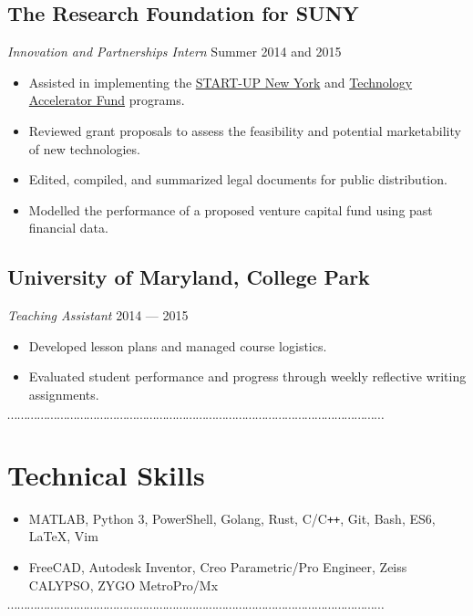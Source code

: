 \documentclass[10pt]{article}
\newcommand{\dotfringe}{
    \begin{center}
      $\cdots\cdots\cdots\cdots\cdots\cdots\cdots\cdots\cdots\cdots\cdots\cdots\cdots\cdots\cdots\cdots\cdots\cdots\cdots\cdots\cdots\cdots\cdots\cdots\cdots\cdots\cdots\cdots\cdots\cdots\cdots\cdots\cdots\cdots\cdots\cdots\cdots\cdots$
    \end{center}
}
\begin{document}
\subsection*{The Research Foundation for SUNY}
\textit{Innovation and Partnerships Intern} \hfill Summer 2014 and 2015
\begin{itemize}
  \item Assisted in implementing the \href{https://esd.ny.gov/startup-ny-program}{START-UP New York} and \href{https://www.rfsuny.org/Our-Work/Innovation-and-Partnerships/Programs/Technology-Accelerator-Fund/}{Technology Accelerator Fund} programs.
  \item Reviewed grant proposals to assess the feasibility and potential marketability of new technologies.
  \item Edited, compiled, and summarized legal documents for public distribution.
  \item Modelled the performance of a proposed venture capital fund using past financial data.
\end{itemize}
\subsection*{University of Maryland, College Park}
\textit{Teaching Assistant} \hfill 2014 --- 2015
\begin{itemize}
  \item Developed lesson plans and managed course logistics.
  \item Evaluated student performance and progress through weekly reflective writing assignments.
\end{itemize}
\dotfringe{}
\section*{Technical Skills}
\begin{itemize}
  \item MATLAB, Python 3, PowerShell, Golang, Rust, C/C\texttt{++}, Git, Bash, ES6, \LaTeX{}, Vim
  \item FreeCAD, Autodesk Inventor, Creo Parametric/Pro Engineer, Zeiss CALYPSO, ZYGO MetroPro/Mx
\end{itemize}

\dotfringe{}
\end{document}
